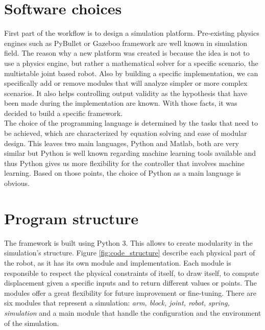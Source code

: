 
    \section{Software choices}
        First part of the workflow is to design a simulation platform. Pre-existing physics engines such as PyBullet or Gazeboo framework are well known in simulation field. The reason why a new platform was created is because the idea is not to use a physics engine, but rather a mathematical solver for a specific scenario, the multistable joint based robot. Also by building a specific implementation, we can specifically add or remove modules that will analyze simpler or more complex scenarios. It also helps controlling  output validity as the hypothesis that have been made during the implementation are known. With those facts, it was decided to build a specific framework.\\
        
        The choice of the programming language is determined by the tasks that need to be achieved, which are characterized by equation solving and ease of modular design. This leaves two main languages, Python and Matlab, both are very similar but Python is well known regarding machine learning tools available and thus Python gives us more flexibility for the controller that involves machine learning. Based on those points, the choice of Python as a main language is obvious.
    
    \section{Program structure}\label{sec:program_structure}
        The framework is built using Python 3. This allows to create modularity in the simulation's structure. Figure \ref{fig:code_structure} describe each physical part of the robot, as it has its own module and implementation. Each module is responsible to respect the physical constraints of itself, to draw itself, to compute displacement given a specific inputs and to return different values or points. The modules offer a great flexibility for future improvement or fine-tuning. There are six modules that represent a simulation: \textit{arm, block, joint, robot, spring, simulation} and a main module that handle the configuration and the environment of the simulation. \\
        
